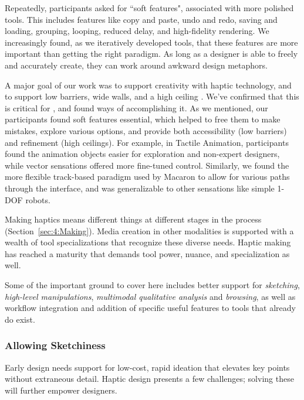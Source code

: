 Repeatedly, participants asked for ``soft features", associated with more polished tools.
This includes features like copy and paste, undo and redo, saving and loading, grouping, looping, reduced delay, and high-fidelity rendering.
We increasingly found, as we iteratively developed \haxd tools, that these features are more important than getting the right paradigm.
As long as a designer is able to freely and accurately create, they can work around awkward design metaphors.

A major goal of our work was to support creativity with haptic technology, and to support low barriers, wide walls, and a high ceiling \cite{Shneiderman2007,Resnick2008}.
We've confirmed that this is critical for \haxd, and found ways of accomplishing it.
As we mentioned, our participants found soft features essential, which helped to free them to make mistakes, explore various options, and provide both accessibility (low barriers) and refinement (high ceilings).
For example, in Tactile Animation, participants found the animation objects easier for exploration and non-expert designers, while vector sensations offered more fine-tuned control.
Similarly, we found the more flexible track-based paradigm used by Macaron to allow for various paths through the interface, and was generalizable to other sensations like simple 1-DOF robots.



Making haptics means different things at different stages in the process (Section~\ref{sec:4:Making}). 
Media creation in other modalities is supported with a wealth of tool specializations that recognize these diverse needs. Haptic making has reached a maturity that demands tool power, nuance, and specialization as well.

Some of the important ground to cover here includes better support for \textit{sketching}, \textit{high-level manipulations}, \textit{multimodal qualitative analysis} and \textit{browsing}, as well as workflow integration and addition of specific useful features to tools that already do exist.

%
%
\subsubsection{Allowing Sketchiness}
Early design needs support for low-cost, rapid ideation that elevates key points without extraneous detail. Haptic design presents a few challenges; solving these will further empower designers.

